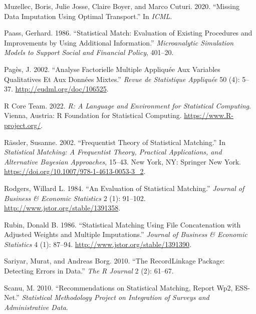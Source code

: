 \begin{CSLReferences}{1}{0}
\leavevmode{}%
Muzellec, Boris, Julie Josse, Claire Boyer, and Marco Cuturi. 2020. {``Missing Data Imputation Using Optimal Transport.''} In \emph{ICML}.

\leavevmode{}%
Paass, Gerhard. 1986. {``Statistical Match: Evaluation of Existing Procedures and Improvements by Using Additional Information.''} \emph{Microanalytic Simulation Models to Support Social and Financial Policy}, 401--20.

\leavevmode{}%
Pagès, J. 2002. {``Analyse Factorielle Multiple Appliquée Aux Variables Qualitatives Et Aux Données Mixtes.''} \emph{Revue de Statistique Appliquée} 50 (4): 5--37. \url{http://eudml.org/doc/106525}.

\leavevmode{}%
R Core Team. 2022. \emph{R: A Language and Environment for Statistical Computing}. Vienna, Austria: R Foundation for Statistical Computing. \url{https://www.R-project.org/}.

\leavevmode{}%
Rässler, Susanne. 2002. {``Frequentist Theory of Statistical Matching.''} In \emph{Statistical Matching: A Frequentist Theory, Practical Applications, and Alternative Bayesian Approaches}, 15--43. New York, NY: Springer New York. \url{https://doi.org/10.1007/978-1-4613-0053-3_2}.

\leavevmode{}%
Rodgers, Willard L. 1984. {``An Evaluation of Statistical Matching.''} \emph{Journal of Business \& Economic Statistics} 2 (1): 91--102. \url{http://www.jstor.org/stable/1391358}.

\leavevmode{}%
Rubin, Donald B. 1986. {``Statistical Matching Using File Concatenation with Adjusted Weights and Multiple Imputations.''} \emph{Journal of Business \& Economic Statistics} 4 (1): 87--94. \url{http://www.jstor.org/stable/1391390}.

\leavevmode{}%
Sariyar, Murat, and Andreas Borg. 2010. {``The RecordLinkage Package: Detecting Errors in Data.''} \emph{The R Journal} 2 (2): 61--67.

\leavevmode{}%
Scanu, M. 2010. {``Recommendations on Statistical Matching, Report Wp2, ESS-Net.''} \emph{Statistical Methodology Project on Integration of Surveys and Administrative Data}.


\end{CSLReferences}
